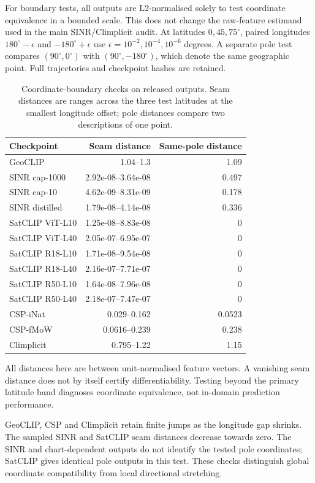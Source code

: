 For boundary tests, all outputs are L2-normalised solely to test coordinate equivalence in a bounded scale. This does not change the raw-feature estimand used in the main SINR/Climplicit audit. At latitudes $0,45,75^\circ$, paired longitudes $180^\circ-\epsilon$ and $-180^\circ+\epsilon$ use $\epsilon=10^{-2},10^{-4},10^{-6}$ degrees. A separate pole test compares $(90^\circ,0^\circ)$ with $(90^\circ,-180^\circ)$, which denote the same geographic point. Full trajectories and checkpoint hashes are retained.
\begin{table}[htbp]\centering\small
\caption{Coordinate-boundary checks on released outputs. Seam distances are ranges across the three test latitudes at the smallest longitude offset; pole distances compare two descriptions of one point.}
\label{tab:boundary}
\begin{tabular}{@{}lrr@{}}\toprule
Checkpoint&Seam distance&Same-pole distance\\\midrule
GeoCLIP&1.04--1.3&1.09\\
SINR cap-1000&2.92e-08--3.64e-08&0.497\\
SINR cap-10&4.62e-09--8.31e-09&0.178\\
SINR distilled&1.79e-08--4.14e-08&0.336\\
SatCLIP ViT-L10&1.25e-08--8.83e-08&0\\
SatCLIP ViT-L40&2.05e-07--6.95e-07&0\\
SatCLIP R18-L10&1.71e-08--9.54e-08&0\\
SatCLIP R18-L40&2.16e-07--7.71e-07&0\\
SatCLIP R50-L10&1.64e-08--7.96e-08&0\\
SatCLIP R50-L40&2.18e-07--7.47e-07&0\\
CSP-iNat&0.029--0.162&0.0523\\
CSP-fMoW&0.0616--0.239&0.238\\
Climplicit&0.795--1.22&1.15\\
\bottomrule\end{tabular}
\par\smallskip\parbox{.97\textwidth}{\footnotesize All distances here are between unit-normalised feature vectors. A vanishing seam distance does not by itself certify differentiability. Testing beyond the primary latitude band diagnoses coordinate equivalence, not in-domain prediction performance.}
\end{table}
GeoCLIP, CSP and Climplicit retain finite jumps as the longitude gap shrinks. The sampled SINR and SatCLIP seam distances decrease towards zero. The SINR and chart-dependent outputs do not identify the tested pole coordinates; SatCLIP gives identical pole outputs in this test. These checks distinguish global coordinate compatibility from local directional stretching.


